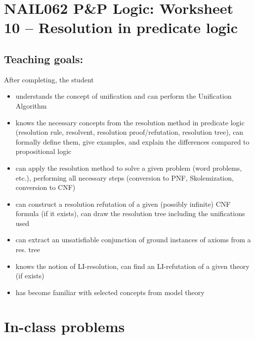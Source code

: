 \section*{NAIL062 P\&P Logic: Worksheet 10 -- Resolution in predicate logic}


\subsection*{Teaching goals:} After completing, the student

    \begin{itemize}\setlength{\itemsep}{0pt}
        \item understands the concept of unification and can perform the Unification Algorithm
        \item knows the necessary concepts from the resolution method in predicate logic (resolution rule, resolvent, resolution proof/refutation, resolution tree), can formally define them, give examples, and explain the differences compared to propositional logic
        \item can apply the resolution method to solve a given problem (word problems, etc.), performing all necessary steps (conversion to PNF, Skolemization, conversion to CNF)
        \item can construct a resolution refutation of a given (possibly infinite) CNF formula (if it exists), can draw the resolution tree including the unifications used
        \item can extract an unsatisfiable conjunction of ground instances of axioms from a res. tree
        \item knows the notion of LI-resolution, can find an LI-refutation of a given theory (if exists)
        \item has become familiar with selected concepts from model theory
    \end{itemize}
    

\section*{In-class problems}


